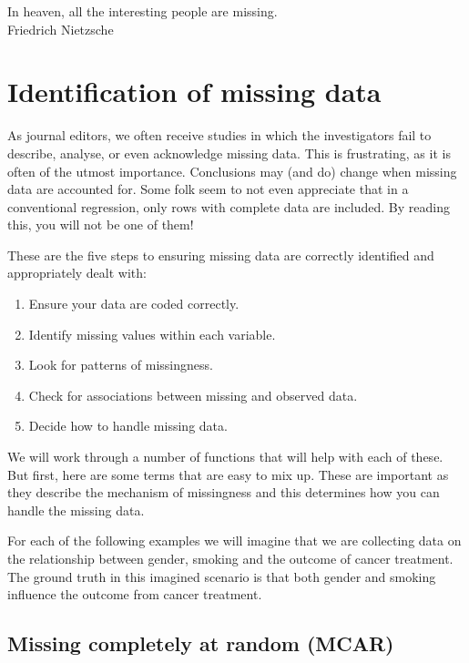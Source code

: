 \documentclass[
  12pt,
  krantz2]{krantz}
\providecommand{\tightlist}{%
  \setlength{\itemsep}{0pt}\setlength{\parskip}{0pt}}
\renewenvironment{quote}{\begin{VF}}{\end{VF}}
\begin{document}
\begin{quote}
In heaven, all the interesting people are missing.\\
Friedrich Nietzsche
\end{quote}

\hypertarget{identification-of-missing-data}{%
\section{Identification of missing data}\label{identification-of-missing-data}}

As journal editors, we often receive studies in which the investigators fail to describe, analyse, or even acknowledge missing data.
This is frustrating, as it is often of the utmost importance.
Conclusions may (and do) change when missing data are accounted for.
Some folk seem to not even appreciate that in a conventional regression, only rows with complete data are included.
By reading this, you will not be one of them!

These are the five steps to ensuring missing data are correctly identified and appropriately dealt with:

\begin{enumerate}
\def\labelenumi{\arabic{enumi}.}
\tightlist
\item
  Ensure your data are coded correctly.
\item
  Identify missing values within each variable.
\item
  Look for patterns of missingness.
\item
  Check for associations between missing and observed data.
\item
  Decide how to handle missing data.
\end{enumerate}

We will work through a number of functions that will help with each of these.
But first, here are some terms that are easy to mix up.
These are important as they describe the mechanism of missingness and this determines how you can handle the missing data.

For each of the following examples we will imagine that we are collecting data on the relationship between gender, smoking and the outcome of cancer treatment.
The ground truth in this imagined scenario is that both gender and smoking influence the outcome from cancer treatment.

\hypertarget{missing-completely-at-random-mcar}{%
\subsection{Missing completely at random (MCAR)}\label{missing-completely-at-random-mcar}}
\end{document}
